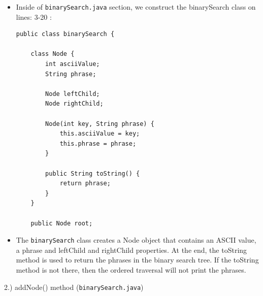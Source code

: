 \documentclass{article}
\begin{document}
\begin{itemize}
\item Inside of \verb|binarySearch.java| section, we construct the binarySearch class on lines: 3-20 :

\begin{verbatim}
public class binarySearch {

    class Node {
        int asciiValue;
        String phrase;

        Node leftChild;
        Node rightChild;

        Node(int key, String phrase) {
            this.asciiValue = key;
            this.phrase = phrase;
        }

        public String toString() {
            return phrase;
        }
    }

    public Node root;
\end{verbatim}
\item The \verb|binarySearch| class creates a Node object that contains an ASCII value, a phrase and  leftChild and rightChild properties. At the end, the toString method is used to return the phrases in the binary search tree. If the toString method is not there, then the ordered traversal will not print the phrases.\\

\end{itemize}


\begin{large}
    2.) addNode() method (\verb|binarySearch.java|)
\end{large}
\end{document}
